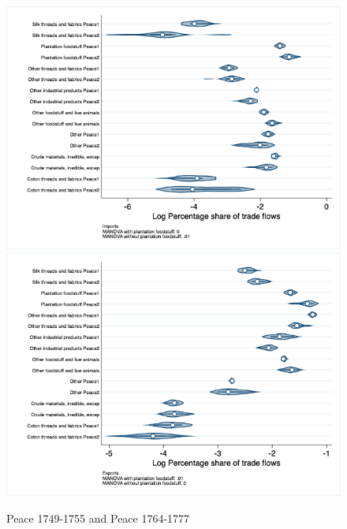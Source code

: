 \documentclass[12pt,a4paper,notitlepage,english]{article}
\begin{document}
\begin{figure}
\centering
\caption{Peace 1749-1755 and Peace 1764-1777}
\label{seven_peace1764_1777_nat_distr_aggr}
\includegraphics[scale=.4]{peace1749_1755_peace1764_1777_nat_distr_Iaggr}
\includegraphics[scale=.4]{peace1749_1755_peace1764_1777_nat_distr_Xaggr}
\end{figure}
\end{document}
